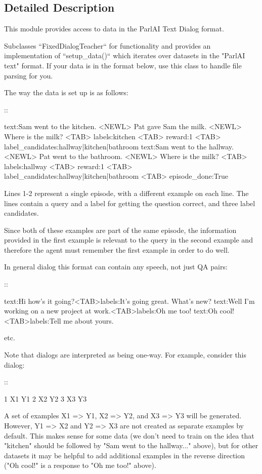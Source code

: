 \subsection{Detailed Description}
\begin{DoxyVerb}This module provides access to data in the ParlAI Text Dialog format.

Subclasses ``FixedDialogTeacher`` for functionality and provides an
implementation of ``setup_data()`` which iterates over datasets in the
"ParlAI text" format. If your data is in the format below, use this class to
handle file parsing for you.

The way the data is set up is as follows:

::

    text:Sam went to the kitchen. <NEWL>
    Pat gave Sam the milk. <NEWL>
    Where is the milk? <TAB> labels:kitchen <TAB> reward:1
    <TAB> label_candidates:hallway|kitchen|bathroom
    text:Sam went to the hallway. <NEWL>
    Pat went to the bathroom. <NEWL>
    Where is the milk? <TAB> labels:hallway <TAB> reward:1
    <TAB> label_candidates:hallway|kitchen|bathroom <TAB> episode_done:True

Lines 1-2 represent a single episode, with a different example on each line.
The lines contain a query and a label for getting the question
correct, and three label candidates.

Since both of these examples are part of the same episode, the information
provided in the first example is relevant to the query in the second
example and therefore the agent must remember the first example in order to
do well.

In general dialog this format can contain any speech, not just QA pairs:

::

    text:Hi how's it going?<TAB>labels:It's going great. What's new?
    text:Well I'm working on a new project at work.<TAB>labels:Oh me too!
    text:Oh cool!<TAB>labels:Tell me about yours.

etc.

Note that dialogs are interpreted as being one-way. For example, consider
this dialog:

::

    1 X1    Y1
    2 X2    Y2
    3 X3    Y3

A set of examples X1 => Y1, X2 => Y2, and X3 => Y3 will be generated.
However, Y1 => X2 and Y2 => X3 are not created as separate examples by
default. This makes sense for some data (we don't need to train on the idea
that "kitchen" should be followed by "Sam went to the hallway..." above),
but for other datasets it may be helpful to add additional examples in the
reverse direction ("Oh cool!" is a response to "Oh me too!" above).
\end{DoxyVerb}
 

